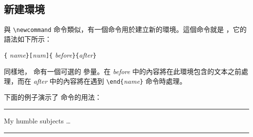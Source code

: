 \subsection{新建環境}

與 \verb|\newcommand| 命令類似，有一個命令用於建立新的環境。這個命令就是
 ，它的語法如下所示：

\begin{lscommand}
\verb|{|%
       \emph{name}\verb|}[|\emph{num}\verb|]{|%
       \emph{before}\verb|}{|\emph{after}\verb|}|
\end{lscommand}

同樣地， 命有一個可選的
參量。在 \emph{before} 中的內容將在此環境包含的文本之前處理，而在
 \emph{after} 中的內容將在遇到 \verb|\end{|\emph{name}\verb|}| 命令時處理。

%

下面的例子演示了  命令的用法：
\begin{example}
\newenvironment{king}
{\rule{1ex}{1ex}%
     \hspace{\stretch{1}}}
{%
     \rule{1ex}{1ex}}

\begin{king}
My humble subjects \ldots
\end{king}
\end{example}

